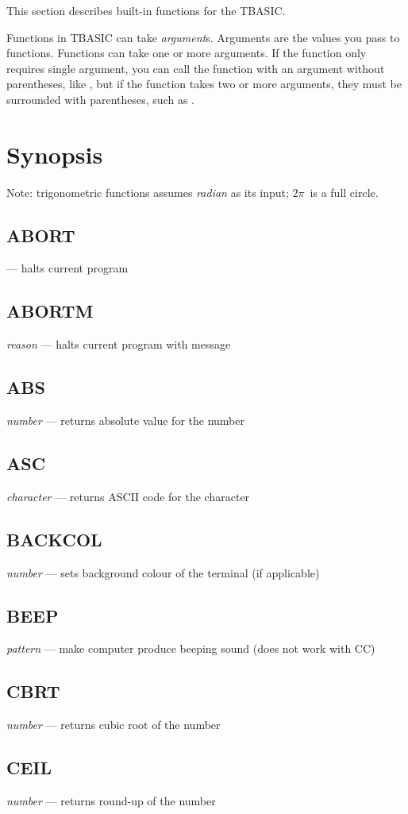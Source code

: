 This section describes built-in functions for the TBASIC.

Functions in TBASIC can take \emph{argument}s. Arguments are the values you pass to functions. Functions can take one or more arguments. If the function only requires single argument, you can call the function with an argument without parentheses, like , but if the function takes two or more arguments, they must be surrounded with parentheses, such as .

\section{Synopsis}

Note: trigonometric functions assumes \emph{radian} as its input; $2\pi$\ is a full circle.

\subsection{ABORT} --- halts current program
\subsection{ABORTM} \emph{reason} --- halts current program with message
\subsection{ABS} \emph{number} --- returns absolute value for the number
\subsection{ASC} \emph{character} --- returns ASCII code for the character
\subsection{BACKCOL} \emph{number} --- sets background colour of the terminal (if applicable)
\subsection{BEEP} \emph{pattern} --- make computer produce beeping sound (does not work with CC)
\subsection{CBRT} \emph{number} --- returns cubic root of the number
\subsection{CEIL} \emph{number} --- returns round-up of the number

